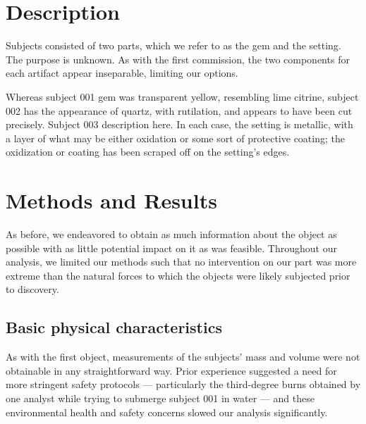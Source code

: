 \documentclass[10pt]{article}
\begin{document}
\maketitle


\section{Description}

Subjects consisted of two parts, which we refer to as the gem and the setting. The purpose is unknown. As with the first commission, the two components for each artifact appear inseparable, limiting our options.

Whereas subject 001 gem was transparent yellow, resembling lime citrine, subject 002 has the appearance of quartz, with rutilation, and appears to have been cut precisely.
Subject 003 description here.
In each case, the setting is metallic, with a layer of what may be either oxidation or some sort of protective coating; the oxidization or coating has been scraped off on the setting's edges.

\section{Methods and Results}
As before, we endeavored to obtain as much information about the object as possible with as little potential impact on it as was feasible.
Throughout our analysis, we limited our methods such that no intervention on our part was more extreme than the natural forces to which the objects were likely subjected prior to discovery.

\subsection{Basic physical characteristics}

As with the first object, measurements of the subjects' mass and volume were not obtainable in any straightforward way.
Prior experience suggested a need for more stringent safety protocols --- particularly the third-degree burns obtained by one analyst while trying to submerge subject 001 in water --- and these environmental health and safety concerns slowed our analysis significantly.
\end{document}
